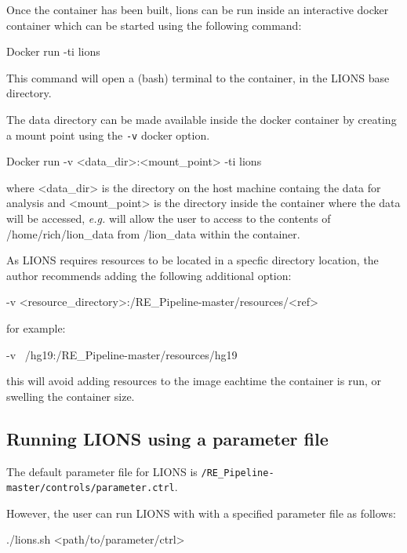 \documentclass[11pt]{scrartcl}
\begin{document}
Once the container has been built, lions can be run inside an interactive docker container
which can be started using the following command:

\begin{bash}
Docker run -ti lions
\end{bash}

This command will open a (bash) terminal to the container, in the LIONS base directory.

The data directory can be made available inside the docker container by creating a mount point using the \texttt{-v} docker option. 
 
\begin{bash}
Docker run -v <data_dir>:<mount_point> -ti lions
\end{bash}

where <data\_dir> is the directory on the host machine containg the data for analysis and <mount\_point> is the directory inside the container where the data will be accessed, \textit{e.g.}  will allow the user to access to the contents of /home/rich/lion\_data from /lion\_data within the container.

\begin{framed}
As LIONS requires resources to be located in a specfic directory location, the author recommends adding the following additional option:
\begin{bash}
-v <resource_directory>:/RE_Pipeline-master/resources/<ref>
\end{bash}
for example:
\begin{bash}
-v ~/hg19:/RE_Pipeline-master/resources/hg19
\end{bash}
this will avoid adding resources to the image eachtime the container is run, or swelling the container size.
\end{framed}

\subsection{Running LIONS using a parameter file}

The default parameter file for LIONS is \texttt{/RE\_Pipeline-master/controls/parameter.ctrl}. 

However, the user can run LIONS with with a specified parameter file as follows:
\begin{bash}
./lions.sh <path/to/parameter/ctrl>
\end{bash}
\end{document}
